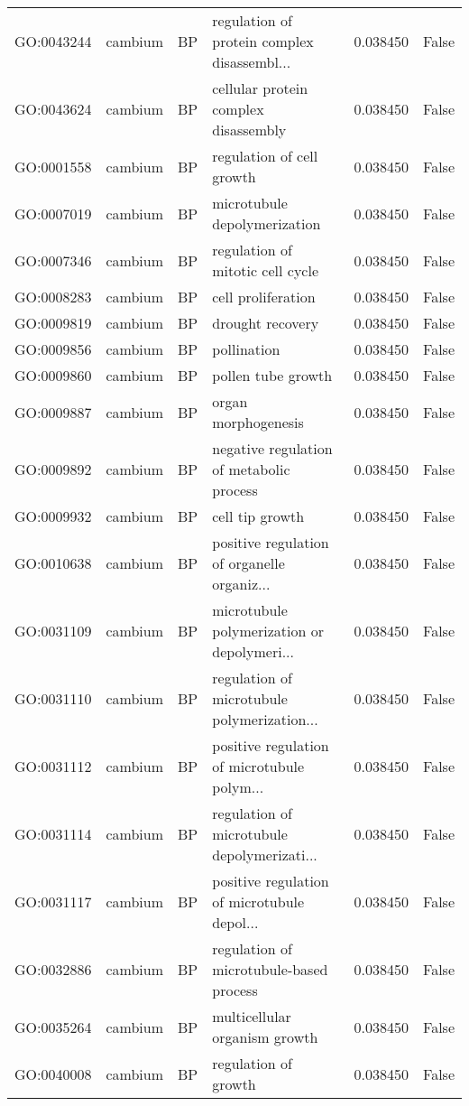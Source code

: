 \begin{longtable}{llllrl}
GO:0043244 & cambium & BP &   regulation of protein complex disassembl...  & 0.038450 &   False \\
GO:0043624 & cambium & BP &   cellular protein complex disassembly  & 0.038450 &   False \\
GO:0001558 & cambium & BP &   regulation of cell growth  & 0.038450 &   False \\
GO:0007019 & cambium & BP &   microtubule depolymerization  & 0.038450 &   False \\
GO:0007346 & cambium & BP &   regulation of mitotic cell cycle  & 0.038450 &   False \\
GO:0008283 & cambium & BP &   cell proliferation  & 0.038450 &   False \\
GO:0009819 & cambium & BP &   drought recovery  & 0.038450 &   False \\
GO:0009856 & cambium & BP &   pollination  & 0.038450 &   False \\
GO:0009860 & cambium & BP &   pollen tube growth  & 0.038450 &   False \\
GO:0009887 & cambium & BP &   organ morphogenesis  & 0.038450 &   False \\
GO:0009892 & cambium & BP &   negative regulation of metabolic process  & 0.038450 &   False \\
GO:0009932 & cambium & BP &   cell tip growth  & 0.038450 &   False \\
GO:0010638 & cambium & BP &   positive regulation of organelle organiz...  & 0.038450 &   False \\
GO:0031109 & cambium & BP &   microtubule polymerization or depolymeri...  & 0.038450 &   False \\
GO:0031110 & cambium & BP &   regulation of microtubule polymerization...  & 0.038450 &   False \\
GO:0031112 & cambium & BP &   positive regulation of microtubule polym...  & 0.038450 &   False \\
GO:0031114 & cambium & BP &   regulation of microtubule depolymerizati...  & 0.038450 &   False \\
GO:0031117 & cambium & BP &   positive regulation of microtubule depol...  & 0.038450 &   False \\
GO:0032886 & cambium & BP &   regulation of microtubule-based process  & 0.038450 &   False \\
GO:0035264 & cambium & BP &   multicellular organism growth  & 0.038450 &   False \\
GO:0040008 & cambium & BP &   regulation of growth  & 0.038450 &   False \\

\end{longtable}
